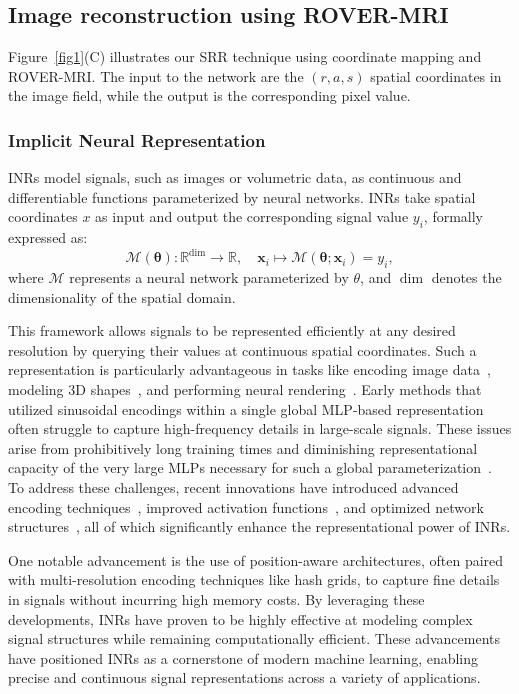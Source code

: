 \documentclass[AMA,STIX2COL]{MRM}
\begin{document}
\subsection{Image reconstruction using ROVER-MRI}
Figure~\ref{fig1}(C) illustrates our SRR technique using coordinate mapping and ROVER-MRI. The input to the network are the $(r,a,s)$ spatial coordinates in the image field, while the output is the corresponding pixel value.  

\subsubsection{Implicit Neural Representation}
INRs model signals, such as images or volumetric data, as continuous and differentiable functions parameterized by neural networks. INRs take spatial coordinates $x$ as input and output the corresponding signal value $y_i$, formally expressed as:
\begin{equation}
\mathcal{M}(\boldsymbol{\theta}) : \mathbb{R}^\mathrm{dim} \to \mathbb{R}, \quad \mathbf{x}_i \mapsto \mathcal{M}(\boldsymbol{\theta}; \mathbf{x}_i) = y_i,
\end{equation}
where $\mathcal{M}$ represents a neural network parameterized by $\theta$, and $\operatorname{dim}$ denotes the dimensionality of the spatial domain.

This framework allows signals to be represented efficiently at any desired resolution by querying their values at continuous spatial coordinates. Such a representation is particularly advantageous in tasks like encoding image data~\cite{sitzmann2019deepvoxels}, modeling 3D shapes~\cite{gao2022get3d}, and performing neural rendering~\cite{wysocki2024ultra}. Early methods that utilized sinusoidal encodings within a single global MLP-based representation often struggle to capture high-frequency details in large-scale signals. These issues arise from prohibitively long training times and diminishing representational capacity of the very large MLPs necessary for such a global parameterization~\cite{xie2022neural}. To address these challenges, recent innovations have introduced advanced encoding techniques~\cite{hamming1952mathematical}, improved activation functions~\cite{sitzmann2020implicit,saragadam2023wire}, and optimized network structures~\cite{kazerouni2024incode,zhu2024disorder}, all of which significantly enhance the representational power of INRs.

One notable advancement is the use of position-aware architectures, often paired with multi-resolution encoding techniques like hash grids, to capture fine details in signals without incurring high memory costs. By leveraging these developments, INRs have proven to be highly effective at modeling complex signal structures while remaining computationally efficient. These advancements have positioned INRs as a cornerstone of modern machine learning, enabling precise and continuous signal representations across a variety of applications.
\end{document}

